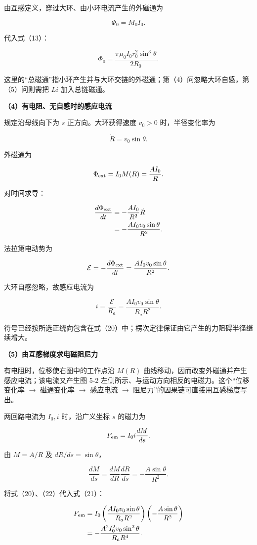 \documentclass[12pt,a4paper,UTF8]{ctexart}
\begin{document}
由互感定义，穿过大环、由小环电流产生的外磁通为

\[\Phi_0=M_0I_0.\]

代入式（13）：

\[\boxed{\Phi_0=
\frac{\pi\mu_0I_0r_0^2\sin^3\theta}{2R_0}}.\]

这里的``总磁通''指小环产生并与大环交链的外磁通；第（4）问忽略大环自感，第（5）问则需把
\(Li\) 加入总链磁通。

\textbf{（4）有电阻、无自感时的感应电流}

规定沿母线向下为 \(s\) 正方向。大环获得速度 \(v_0>0\) 时，半径变化率为

\[\dot R=v_0\sin\theta.\]

外磁通为

\[\Phi_{\rm ext}=I_0M(R)=\frac{AI_0}{R}.\]

对时间求导：

\[\begin{aligned}
\frac{d\Phi_{\rm ext}}{dt}
&=-\frac{AI_0}{R^2}\dot R\\
&=-\frac{AI_0v_0\sin\theta}{R^2}.
\end{aligned}\]

法拉第电动势为

\[\mathcal E=-\frac{d\Phi_{\rm ext}}{dt}
=\frac{AI_0v_0\sin\theta}{R^2}.\]

大环自感忽略，故感应电流为

\[i=\frac{\mathcal E}{R_a}
=\frac{AI_0v_0\sin\theta}{R_aR^2}.\]

符号已经按所选正绕向包含在式（20）中；楞次定律保证由它产生的力阻碍半径继续增大。

\textbf{（5）由互感梯度求电磁阻尼力}

有电阻时，位移使右图中的工作点沿 \(M(R)\)
曲线移动，因而改变外磁通并产生感应电流；该电流又产生图 5-2
左侧所示、与运动方向相反的电磁力。这个``位移变化率 \(\to\) 磁通变化率
\(\to\) 感应电流 \(\to\) 阻尼力''的因果链可直接用互感梯度写出。

两回路电流为 \(I_0,i\) 时，沿广义坐标 \(s\) 的磁力为

\[F_{\rm em}=I_0i\frac{dM}{ds}.\]

由 \(M=A/R\) 及 \(dR/ds=\sin\theta\)，

\[\frac{dM}{ds}
=\frac{dM}{dR}\frac{dR}{ds}
=-\frac{A\sin\theta}{R^2}.\]

将式（20）、（22）代入式（21）：

\[\begin{aligned}
F_{\rm em}
&=I_0\left(\frac{AI_0v_0\sin\theta}{R_aR^2}\right)
\left(-\frac{A\sin\theta}{R^2}\right)\\
&=-\frac{A^2I_0^2v_0\sin^2\theta}{R_aR^4}.
\end{aligned}\]
\end{document}
